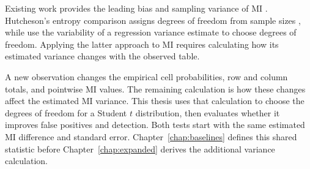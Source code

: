 Existing work provides the leading bias and sampling variance of MI
\citep{miller1955,moddemeijer1989,brillinger2004,paninski2003}.
Hutcheson's entropy comparison assigns degrees of freedom from sample sizes
\citep{hutcheson1970}, while \citet{panwall2002} use the variability of a
regression variance estimate to choose degrees of freedom. Applying the
latter approach to MI requires calculating how its estimated variance
changes with the observed table.

A new observation changes the empirical cell probabilities, row and column
totals, and pointwise MI values. The remaining calculation is how these
changes affect the estimated MI variance. This thesis uses that calculation
to choose the degrees of freedom for a Student \(t\) distribution, then
evaluates whether it improves false positives and detection.
Both tests start with the same estimated MI difference and standard error.
Chapter~\ref{chap:baselines} defines this shared statistic before
Chapter~\ref{chap:expanded} derives the additional variance calculation.
